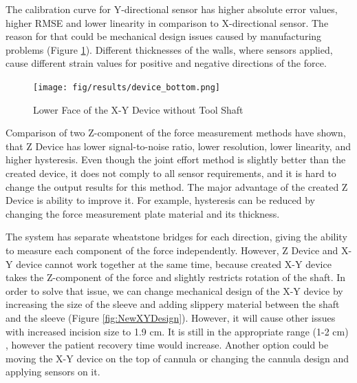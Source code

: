The calibration curve for Y-directional sensor has higher absolute error values, higher RMSE and lower linearity in comparison to X-directional sensor. The reason for that could be mechanical design issues caused by manufacturing problems (Figure \ref{fig:Syst_err_expl}). Different thicknesses of the walls, where sensors applied, cause different strain values for positive and negative directions of the force.

\begin{figure}[h]
	\begin{center}
	\texttt{[image: fig/results/device\_bottom.png]}
	\end{center}
	\vspace{-4mm}
	\caption[Lower Face of the X-Y Device without Tool Shaft]
	{Lower Face of the X-Y Device without Tool Shaft}
	\label{fig:Syst_err_expl}
	\vspace{-2mm}
\end{figure}

	Comparison of two Z-component of the force measurement methods have shown, that Z Device has lower signal-to-noise ratio, lower resolution, lower linearity, and higher hysteresis. Even though the joint effort method is slightly better than the created device, it does not comply to all sensor requirements, and it is hard to change the output results for this method. The major advantage of the created Z Device is ability to improve it. For example, hysteresis can be reduced by changing the force measurement plate material and its thickness.

The system has separate wheatstone bridges for each direction, giving the ability to measure each component of the force independently. However, Z Device and X-Y device cannot work together at the same time, because created X-Y device takes the Z-component of the force and slightly restricts rotation of the shaft. In order to solve that issue, we can change mechanical design of the X-Y device by increasing the size of the sleeve and adding slippery material between the shaft and the sleeve (Figure \ref{fig:NewXYDesign}). However, it will cause other issues with increased incision size to 1.9 cm. It is still in the appropriate range (1-2 cm) \cite{_laparoscopy}, however the patient recovery time would increase. Another option could be moving the X-Y device on the top of cannula or changing the cannula design and applying sensors on it.

